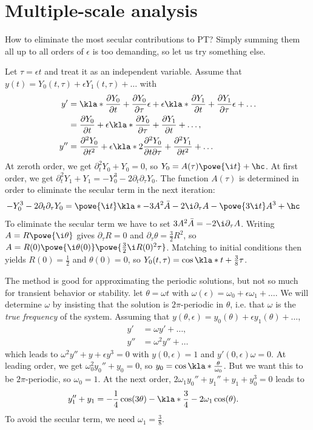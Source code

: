 \documentclass[english, parskip=full]{scrbook}
\newcommand{\definition}[2]{\begin{tcolorbox}[colback=colorbackgrounddefinition,colframe=colordefinition, breakable,enhanced,title=\textbf{#1}.]#2\end{tcolorbox}}
\newcommand{\example}[3]{\begin{tcolorbox}[colback=colorbackgroundexample,colframe=colorexample, breakable,enhanced,title={\textbf{#1}: #2.}]#3\end{tcolorbox}}
\begin{document}
\section{Multiple-scale analysis}
How to eliminate the most secular contributions to PT?
Simply summing them all up to all orders of $\epsilon$ is too demanding, so let us try something else.
\example{Duffing equation}{$y''+y+\epsilon y^3=0$, $y(0)=1$, $y'(0)=0$}{
Let $\tau = \epsilon t$ and treat it as an independent variable.
Assume that $y(t)=Y_0(t,\tau) + \epsilon Y_1(t,\tau) + \dots$ with
\begin{align}
y' &= \kla*{\frac{\partial Y_0}{\partial t} + \frac{\partial Y_0}{\partial\tau} \epsilon} + \epsilon\kla*{\frac{\partial Y_1}{\partial t} + \frac{\partial Y_1}{\partial\tau} \epsilon} + \dots\\
&= \frac{\partial Y_0}{\partial t} + \epsilon\kla*{\frac{\partial Y_0}{\partial\tau} + \frac{\partial Y_1}{\partial t}} + \dots,\\
y'' &= \frac{\partial^2 Y_0}{\partial t^2} + \epsilon\kla*{2 \frac{\partial^2 Y_0}{\partial t \partial \tau} + \frac{\partial^2 Y_1}{\partial t^2}} + \dots
\end{align}
At zeroth order, we get $\partial_t^2 Y_0 + Y_0=0$, so $Y_0=A(\tau)\powe{\i t}+\hc$.
At first order, we get $\partial_t^2 Y_1 + Y_1=-Y_0^3 - 2\partial_t\partial_\tau Y_0$.
The function $A(\tau)$ is determined in order to eliminate the secular term in the next iteration:
\begin{align}
-Y_0^3-2\partial_t\partial_\tau Y_0 &= \powe{\i t} \kla*{-3A^2 \bar{A} - 2\i \partial_\tau A} - \powe{3\i t} A^3 + \hc
\end{align}
To eliminate the secular term we have to set $3A^2\bar{A} = -2\i \partial_\tau A$.
Writing $A=R\powe{\i \theta}$ gives $\partial_\tau R=0$ and $\partial_\tau \theta = \frac{3}{2} R^2$, so $A=R(0)\powe{\i \theta(0)} \powe{\frac{3}{2}\i R(0)^2 \tau}$.
Matching to initial conditions then yields $R(0)=\frac{1}{2}$ and $\theta(0)=0$, so $Y_0(t,\tau) = \cos\kla*{t + \frac{3}{8}\tau}$.
}
\definition{Poincare-Lindstedt}{
The  method is good for approximating the periodic solutions, but not so much for transient behavior or stability.
let $\theta = \omega t$ with $\omega(\epsilon) = \omega_0 + \epsilon \omega_1 + \dots$.
We will determine $\omega$ by insisting that the solution is $2\pi$-periodic in $\theta$, i.e. that $\omega$ is the \emph{true frequency} of the system.
Assuming that $y(\theta,\epsilon) = y_0(\theta) + \epsilon y_1(\theta) + \dots$,
\begin{align}
y' &= \omega y' + \dots,\\
y'' &= \omega^2 y'' + \dots
\end{align}
which leads to $\omega^2 y''+y+\epsilon y^3 = 0$ with $y(0,\epsilon)=1$ and $y'(0,\epsilon)\omega = 0$.
At leading order, we get $\omega_0^2y_0''+y_0=0$, so $y_0=\cos\kla*{\frac{\theta}{\omega_0}}$.
But we want this to be $2\pi$-periodic, so $\omega_0=1$.
At the next order, $2\omega_1 y_0'' + y_1'' + y_1 + y_0^3=0$ leads to
\begin{align}
y_1''+y_1 &= -\frac{1}{4} \cos(3\theta) - \kla*{\frac{3}{4} - 2\omega_1}\cos(\theta).
\end{align}
To avoid the secular term, we need $\omega_1 = \frac{3}{8}$.
}
\end{document}
